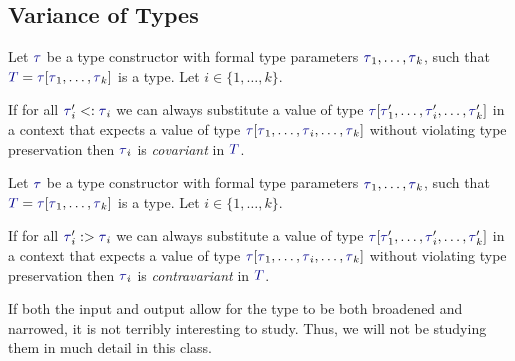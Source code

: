 \subsection{Variance of Types}\label{subsec:Type_Variance}
\begin{definition}[Covariance]\label{def:Type_Covariance}
  Let $\DataType$ be a type constructor with formal type parameters $\DataType_{1}, \ldots , \DataType_{k}$, such that $\SemanticType{T} = \DataType [\DataType_{1}, \ldots, \DataType_{k}]$ is a type.
  Let $i \in \lbrace 1,\ldots, k \rbrace$.

  If for all $\DataType_{i}' <: \DataType_{i}$ we can always substitute a value of type $\DataType [\DataType_{1}',\ldots, \DataType_{i}', \ldots, \DataType_{k}']$ in a context that expects a value of type $\DataType [\DataType_{1}, \ldots, \DataType_{i}, \ldots, \DataType_{k}]$ without violating type preservation then $\DataType_{i}$ is \emph{covariant} in $\SemanticType{T}$.
\end{definition}

\begin{definition}[Contravariance]\label{Type_Contravariance}
  Let $\DataType$ be a type constructor with formal type parameters $\DataType_{1}, \ldots , \DataType_{k}$, such that $\SemanticType{T} = \DataType [\DataType_{1}, \ldots, \DataType_{k}]$ is a type.
  Let $i \in \lbrace 1,\ldots, k \rbrace$.

  If for all $\DataType_{i}' :> \DataType_{i}$ we can always substitute a value of type $\DataType [\DataType_{1}',\ldots, \DataType_{i}', \ldots, \DataType_{k}']$ in a context that expects a value of type $\DataType [\DataType_{1}, \ldots, \DataType_{i}, \ldots, \DataType_{k}]$ without violating type preservation then $\DataType_{i}$ is \emph{contravariant} in $\SemanticType{T}$.
\end{definition}

\begin{definition}[Invariance]\label{def:Type_Invariance}
\end{definition}

\begin{definition}[Bivariance]\label{def:Type_Bivariance}
  \begin{remark}
    If both the input and output allow for the type to be both broadened and narrowed, it is not terribly interesting to study.
    Thus, we will not be studying them in much detail in this class.
  \end{remark}
\end{definition}

